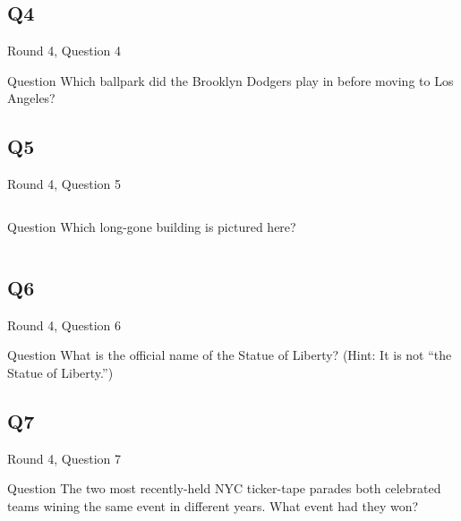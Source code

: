 \documentclass[11pt]{beamer}
\begin{document}
\subsection*{Q4}
\begin{frame}[t]{Round 4, Question 4}
\begin{block}{Question}
Which ballpark did the Brooklyn Dodgers play in before moving to Los Angeles?
\end{block}
\end{frame}
\subsection*{Q5}
\begin{frame}[t]{Round 4, Question 5}
\begin{columns}[T,totalwidth=\linewidth]
\begin{column}{0.32\linewidth}
\begin{block}{Question}
Which long-gone building is pictured here?
\end{block}
\end{column}
\begin{column}{0.65\linewidth}
\begin{center}
\texttt{[image: \{Images/singerbuilding]}.jpg}
\end{center}
\end{column}
\end{columns}
\end{frame}
\subsection*{Q6}
\begin{frame}[t]{Round 4, Question 6}
\begin{block}{Question}
What is the official name of the Statue of Liberty? (Hint: It is not ``the Statue of Liberty.'')
\end{block}
\end{frame}
\subsection*{Q7}
\begin{frame}[t]{Round 4, Question 7}
\begin{block}{Question}
The two most recently-held NYC ticker-tape parades both celebrated teams wining the same event in different years. What event had they won?
\end{block}
\end{frame}
\end{document}
